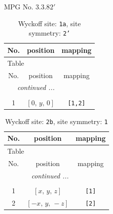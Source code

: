 \documentclass[fleqn,8pt]{jsarticle}
\begin{document}
\setcounter{MaxMatrixCols}{32}

\renewcommand{\tablename}{Table~}
\renewcommand{\figurename}{Figure~}
\begin{center}
\LARGE
MPG No. 3.3.8\quad$2'$
\end{center}
\renewcommand{\arraystretch}{1.2}
\begin{longtable}{ccc}
\caption{Wyckoff site: {\tt 1a}, site symmetry: {\tt 2'}}
 \\
 \hline \hline
No. & position & mapping \\ \hline \endfirsthead

\multicolumn{2}{l}{\tablename\ \thetable{}} \\
 \hline \hline
No. & position & mapping \\ \hline \endhead

 \hline \hline
\multicolumn{2}{r}{\footnotesize\it continued ...} \\ \endfoot

 \hline \hline
\multicolumn{2}{r}{} \\ \endlastfoot

1 & $\left[ 0,\, y,\, 0 \right]$ & {\tt [1,2]} \\
\end{longtable}
\renewcommand{\arraystretch}{1.2}
\begin{longtable}{ccc}
\caption{Wyckoff site: {\tt 2b}, site symmetry: {\tt 1}}
 \\
 \hline \hline
No. & position & mapping \\ \hline \endfirsthead

\multicolumn{2}{l}{\tablename\ \thetable{}} \\
 \hline \hline
No. & position & mapping \\ \hline \endhead

 \hline \hline
\multicolumn{2}{r}{\footnotesize\it continued ...} \\ \endfoot

 \hline \hline
\multicolumn{2}{r}{} \\ \endlastfoot

1 & $\left[ x,\, y,\, z \right]$ & {\tt [1]} \\ \hline
2 & $\left[ - x,\, y,\, - z \right]$ & {\tt [2]} \\
\end{longtable}
\end{document}
